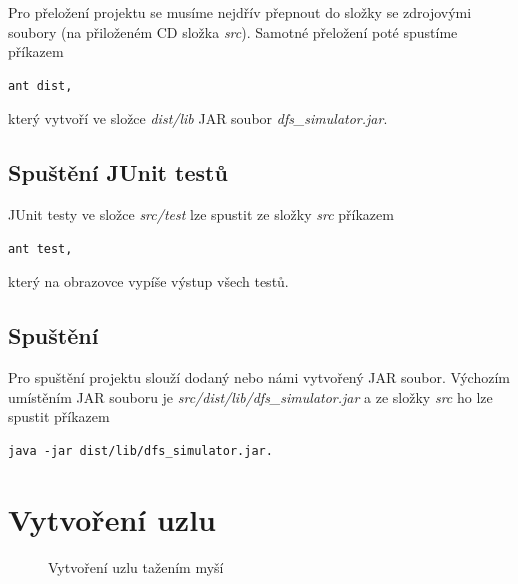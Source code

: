 \documentclass[czech,DP]{thesiskiv}
\begin{document}
Pro přeložení projektu se musíme nejdřív přepnout do složky se zdrojovými soubory (na přiloženém CD složka \textit{src}). Samotné přeložení poté spustíme příkazem

\begin{verbatim}
ant dist,
\end{verbatim}

\noindent který vytvoří ve složce \textit{dist/lib} JAR soubor \textit{dfs\_simulator.jar}.

\subsection{Spuštění JUnit testů}

JUnit testy ve složce \textit{src/test} lze spustit ze složky \textit{src} příkazem

\begin{verbatim}
ant test,
\end{verbatim}
\noindent který na obrazovce vypíše výstup všech testů.

\subsection{Spuštění}

Pro spuštění projektu slouží dodaný nebo námi vytvořený JAR soubor. Výchozím umístěním JAR souboru je \textit{src/dist/lib/dfs\_simulator.jar} a ze složky \textit{src} ho lze spustit příkazem

\begin{verbatim}
java -jar dist/lib/dfs_simulator.jar.
\end{verbatim}

\section{Vytvoření uzlu}

\begin{figure}
\centering
\caption{Vytvoření uzlu tažením myší}
\label{fig:p_vytvoreni_uzel_mys}
\end{figure}
\end{document}
